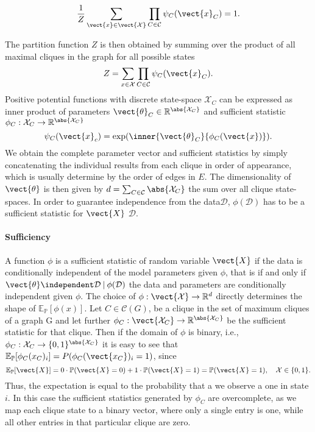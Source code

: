 \begin{equation}
    \frac{1}{Z} \sum_{\vect{x}\in \mathcal{\vect{X}}} \prod_{C \in \mathcal{C}} \psi_C(\vect{x}_C) = 1. 
\end{equation}

The partition function $Z$ is then obtained by summing over the product of all maximal cliques in the graph for all possible states
\begin{equation}
    Z = \sum_{x\in \mathcal{X}} \prod_{C \in \mathcal{C}} \psi_C(\vect{x}_C).
\end{equation}
Positive potential functions with discrete state-space $\mathcal{X}_C$ can be expressed as inner product of parameters $\vect{\theta}_C \in \mathbb{R}^{\abs{\mathcal{X}_C}}$ and sufficient statistic $\phi_C: \mathcal{X}_C \rightarrow \mathbb{R}^{\abs{\mathcal{X}_C}}$ 
\begin{equation}
    \psi_C(\vect{x}_c) = \exp(\inner{\vect{\theta}_C}{\phi_C(\vect{x})}).
\end{equation}
We obtain the complete parameter vector and sufficient statistics by simply concatenating the individual results from each clique in order of appearance, which is usually determine by the order of edges in $E$.
The dimensionality of $\vect{\theta}$ is then given by $d = \sum_{C \in \mathcal{C}} \abs{\mathcal{X}_C}$ the sum over all clique state-spaces.
In order to guarantee independence from the data$\mathcal{D}$,  $\phi(\mathcal{D})$ has to be a sufficient statistic for $\vect{X}$ \wrt $\mathcal{D}$.
\paragraph*{Sufficiency}
    A function $\phi$  is a sufficient statistic of random variable $\vect{X}$ if the data is conditionally independent of the model parameters given $\phi$, that is if and only if $\vect{\theta}\independent \mathcal{D} \:\lvert\: \phi(\mathcal{D})$ the data and parameters are conditionally independent given $\phi$.
    The choice of $\phi: \vect{\mathcal{X}} \rightarrow \mathbb{R}^d$ directly determines the shape of  $\mathbb{E}_{\mathbb{P}}[\phi(x)]$.
    Let $C \in \mathcal{C}(G)$, be a clique in the set of maximum cliques of a graph G and let further
    $\phi_C: \vect{\mathcal{X}_C} \rightarrow \mathbb{R}^{\abs{\mathcal{X}_C}}$ be the sufficient statistic for that clique.
    Then if the domain of $\phi$ is binary, i.e., $\phi_C : \mathcal{X}_C \rightarrow \{0,1\}^{\abs{\mathcal{X}_C}}$ it is easy to see that  $\mathbb{E}_{\mathbb{P}}[\phi_C(x_C)_i] = P(\phi_C(\vect{x_C})_i = 1)$, since
    \begin{equation}
        \mathbb{E}_{\mathbb{P}}[\vect{X}] = 0 \cdot \mathbb{P}(\vect{X} = 0) + 1 \cdot \mathbb{P}(\vect{X}= 1) = \mathbb{P}(\vect{X} = 1), \quad \mathcal{X} \in \{0,1\}.
    \end{equation}
    Thus, the expectation is equal to the probability that a we observe a one in state $i$.
    In this case the sufficient statistics generated by $\phi_C$ are overcomplete, as we map each clique state to a binary vector, where only a single entry is one, while all other entries in that particular clique are zero.  

